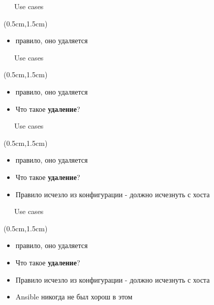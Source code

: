 \documentclass[xetex,18pt,aspectratio=43]{beamer}
\begin{document}
\begin{Large}
\begin{frame}{\ \ \ Use cases}
\begin{textblock*}{\framewidth-0.8cm}(0.5cm,1.5cm)
\begin{itemize}
  \item {\color {darkpastelgreen}{\bf Я удаляю}} правило, оно удаляется
\end{itemize}
\end{textblock*}
\end{frame}

\begin{frame}{\ \ \ Use cases}
\begin{textblock*}{\framewidth-0.8cm}(0.5cm,1.5cm)
\begin{itemize}
  \item {\color {darkpastelgreen}{\bf Я удаляю}} правило, оно удаляется
  \item Что такое {\bf удаление}?
\end{itemize}
\end{textblock*}
\end{frame}

\begin{frame}{\ \ \ Use cases}
\begin{textblock*}{\framewidth-0.8cm}(0.5cm,1.5cm)
\begin{itemize}
  \item {\color {darkpastelgreen}{\bf Я удаляю}} правило, оно удаляется
  \item Что такое {\bf удаление}?
  \item Правило исчезло из конфигурации - должно исчезнуть с хоста
\end{itemize}
\end{textblock*}
\end{frame}

\begin{frame}{\ \ \ Use cases}
\begin{textblock*}{\framewidth-0.8cm}(0.5cm,1.5cm)
\begin{itemize}
  \item {\color {darkpastelgreen}{\bf Я удаляю}} правило, оно удаляется
  \item Что такое {\bf удаление}?
  \item Правило исчезло из конфигурации - должно исчезнуть с хоста
  \item Ansible никогда не был хорош в этом
\end{itemize}
\end{textblock*}
\end{frame}


\end{Large}
\end{document}
